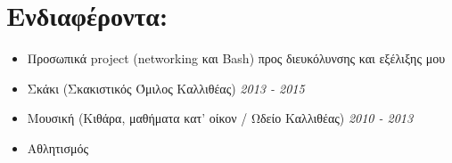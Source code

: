 \documentclass[letterpaper, 11pt]{article}
\newcommand{\secStartSpace}{\vspace{3pt}}
\newcommand{\secEndSpace}{\vspace{5pt}}
\begin{document}
\section{\color{red} \textbf{Ενδιαφέροντα:}}
\secStartSpace
\begin{addmargin}[1em]{1em}
	\begin{itemize}
		\item \small{Προσωπικά project (networking και Bash) προς διευκόλυνσης και εξέλιξης μου}
		\item \small{Σκάκι (Σκακιστικός Όμιλος Καλλιθέας)} \hfill \textit{2013 - 2015}
		\item \small{Μουσική (Κιθάρα, μαθήματα κατ' οίκον / Ωδείο Καλλιθέας)} \hfill \textit{2010 - 2013}
		\item \small{Αθλητισμός}
	\end{itemize}
\end{addmargin}
\secEndSpace
\end{document}
